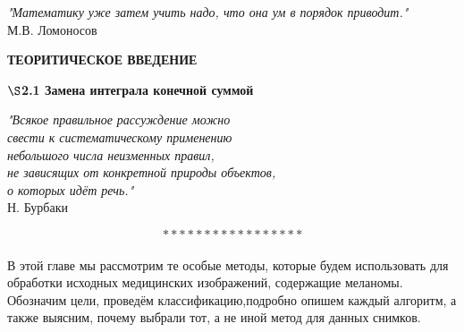\documentclass[12pt]{article}
\begin{document}
\begin{flushright}
	\textit{"Математику уже затем учить надо, что она ум в порядок приводит."}\\
	М.В. Ломоносов
\end{flushright}



\newpage
\begin{center}
	\textbf{ТЕОРИТИЧЕСКОЕ ВВЕДЕНИЕ}\\
\end{center}
\begin{center}
	\textbf{$ \S $2.1 Замена интеграла конечной суммой }
\end{center}
\begin{flushright}
\textit{	"Всякое правильное рассуждение можно\\
	 свести к систематическому применению\\
	 небольшого числа неизменных правил,\\
	 не зависящих от конкретной природы объектов,\\
	 о которых идёт речь."}\\
	Н. Бурбаки
\end{flushright}

$$ \ast\ast\ast\ast\ast\ast\ast\ast\ast\ast\ast\ast\ast\ast\ast\ast\ast $$ \\

В этой главе мы рассмотрим те особые методы, которые будем использовать для обработки исходных медицинских изображений, содержащие меланомы. Обозначим цели, проведём классификацию,подробно опишем каждый алгоритм, а также выясним, почему выбрали тот, а не иной метод для данных снимков.\\
\end{document}
